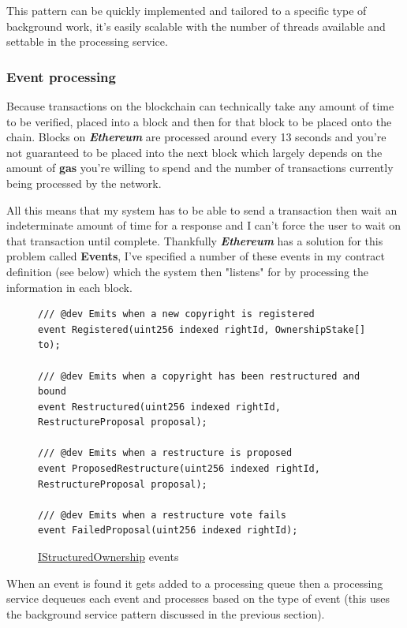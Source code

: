 \documentclass[12pt]{article}
\newcommand{\keyword}[1]{\textbf{\textit{#1}}}
\begin{document}
This pattern can be quickly implemented and tailored to a specific type of background work, it's easily scalable with the number of threads available and settable in the processing service.

\subsubsection{Event processing}

Because transactions on the blockchain can technically take any amount of time to be verified, placed into a block and then for that block to be placed onto the chain. Blocks on \keyword{Ethereum} are processed around every 13 seconds and you're not guaranteed to be placed into the next block which largely depends on the amount of \textbf{gas} you're willing to spend and the number of transactions currently being processed by the network.

All this means that my system has to be able to send a transaction then wait an indeterminate amount of time for a response and I can't force the user to wait on that transaction until complete. Thankfully \keyword{Ethereum} has a solution for this problem called \textbf{Events}, I've specified a number of these events in my contract definition (see below) which the system then "listens" for by processing the information in each block.

\begin{figure}[H]
\caption{\href{https://github.com/MrHarrisonBarker/CRPL/blob/main/CRPL.Contracts/contracts/IStructuredOwnership.sol}{IStructuredOwnership} events}
\begin{lstlisting}[language=Solidity]
/// @dev Emits when a new copyright is registered
event Registered(uint256 indexed rightId, OwnershipStake[] to);

/// @dev Emits when a copyright has been restructured and bound
event Restructured(uint256 indexed rightId, RestructureProposal proposal);

/// @dev Emits when a restructure is proposed
event ProposedRestructure(uint256 indexed rightId, RestructureProposal proposal);

/// @dev Emits when a restructure vote fails
event FailedProposal(uint256 indexed rightId);
\end{lstlisting}
\end{figure}

When an event is found it gets added to a processing queue then a processing service dequeues each event and processes based on the type of event (this uses the background service pattern discussed in the previous section).
\end{document}
